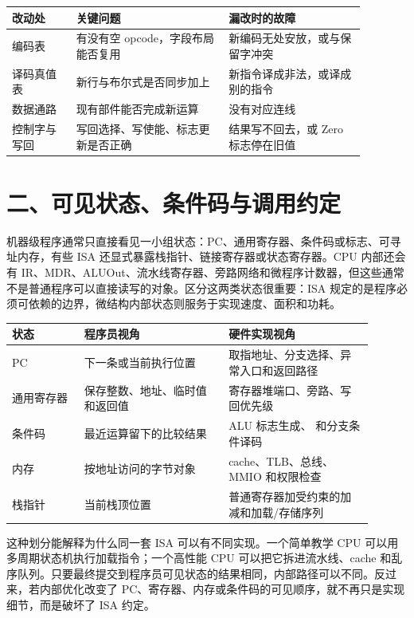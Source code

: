 \begin{longtable}{L{0.16\linewidth}L{0.38\linewidth}L{0.34\linewidth}}
\toprule
改动处 & 关键问题 & 漏改时的故障 \\
\midrule
编码表 & 有没有空 opcode，字段布局能否复用 & 新编码无处安放，或与保留字冲突 \\\tablerowrule
译码真值表 & 新行与布尔式是否同步加上 & 新指令译成非法，或译成别的指令 \\\tablerowrule
数据通路 & 现有部件能否完成新运算 &  没有对应连线 \\\tablerowrule
控制字与写回 & 写回选择、写使能、标志更新是否正确 & 结果写不回去，或 Zero 标志停在旧值 \\
\bottomrule
\end{longtable}

\section{二、可见状态、条件码与调用约定}

机器级程序通常只直接看见一小组状态：PC、通用寄存器、条件码或标志、可寻址内存，有些 ISA 还显式暴露栈指针、链接寄存器或状态寄存器。CPU 内部还会有 IR、MDR、ALUOut、流水线寄存器、旁路网络和微程序计数器，但这些通常不是普通程序可以直接读写的对象。区分这两类状态很重要：ISA 规定的是程序必须可依赖的边界，微结构内部状态则服务于实现速度、面积和功耗。

\begin{longtable}{L{0.18\linewidth}L{0.36\linewidth}L{0.36\linewidth}}
\toprule
状态 & 程序员视角 & 硬件实现视角 \\
\midrule
PC & 下一条或当前执行位置 & 取指地址、分支选择、异常入口和返回路径 \\\tablerowrule
通用寄存器 & 保存整数、地址、临时值和返回值 & 寄存器堆端口、旁路、写回优先级 \\\tablerowrule
条件码 & 最近运算留下的比较结果 & ALU 标志生成、 和分支条件译码 \\\tablerowrule
内存 & 按地址访问的字节对象 & cache、TLB、总线、MMIO 和权限检查 \\\tablerowrule
栈指针 & 当前栈顶位置 & 普通寄存器加受约束的加减和加载/存储序列 \\
\bottomrule
\end{longtable}

这种划分能解释为什么同一套 ISA 可以有不同实现。一个简单教学 CPU 可以用多周期状态机执行加载指令；一个高性能 CPU 可以把它拆进流水线、cache 和乱序队列。只要最终提交到程序员可见状态的结果相同，内部路径可以不同。反过来，若内部优化改变了 PC、寄存器、内存或条件码的可见顺序，就不再只是实现细节，而是破坏了 ISA 约定。

